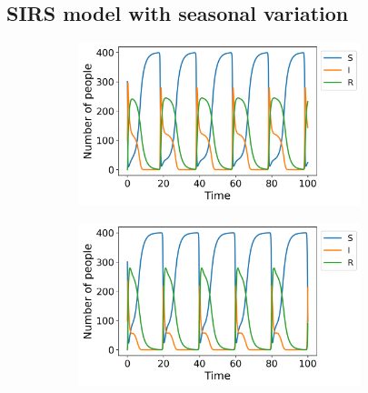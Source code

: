 \documentclass[../main.tex]{subfiles}
\begin{document}
\subsection{SIRS model with seasonal variation}
\iffalse
\begin{figure}[htb!]
    \centering
    \begin{subfigure}[b]{0.475\textwidth}
    \centering
    \includegraphics[width=0.9\textwidth]{../figures/SIRS_harmonical_rk4_b=1.png}
    \caption{}
    \label{fig:seasonal_b=1}
    \end{subfigure}
    \quad
    \begin{subfigure}[b]{0.475\textwidth}
    \includegraphics[width=0.9\textwidth]{../figures/SIRS_harmonical_rk4_b=2.png}
    \caption{}
    \label{fig:seasonal_b=2}
    \end{subfigure}
    

\end{figure}
\end{document}
